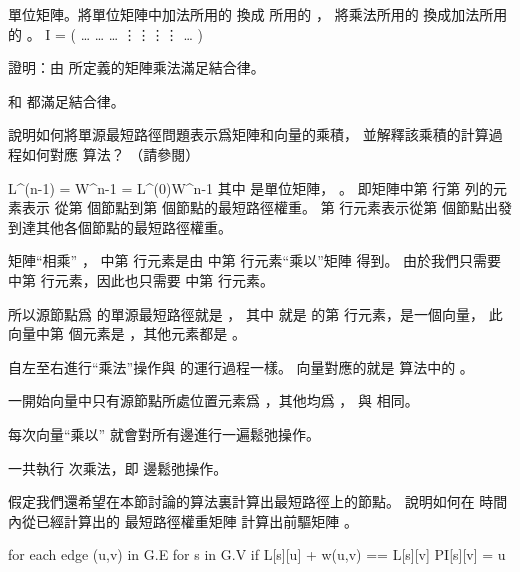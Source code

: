 \startANSWER
單位矩陣。將單位矩陣中加法所用的  換成 \m{\min} 所用的 \m{\infty}，
將乘法所用的  換成加法所用的 。
\startformula
I = \left(\startmatrix
{}   \NC \ldots {} \NR
{}   \NC \ldots {} \NR
{}   \NC \ldots {} \NR
\NC \vdots \NC \vdots \NC \vdots \NC \ddots \NC \vdots \NR
{}   \NC \ldots {} \NR
\stopmatrix\right)
\stopformula
\stopANSWER

\startEXERCISE
證明：由  所定義的矩陣乘法滿足結合律。
\stopEXERCISE

\startANSWER
\m{\min} 和 \m{+} 都滿足結合律。
\stopANSWER

\startEXERCISE
說明如何將單源最短路徑問題表示爲矩陣和向量的乘積，
並解釋該乘積的計算過程如何對應  算法？
（請參閱）
\stopEXERCISE

\startANSWER
\startformula
L^{(n-1)} = W^{n-1} = L^{(0)}\cdot W^{n-1}
\stopformula
其中  是單位矩陣， 。
即矩陣中第  行第  列的元素表示
從第  個節點到第  個節點的最短路徑權重。
第  行元素表示從第  個節點出發到達其他各個節點的最短路徑權重。

矩陣“相乘” ，
  中第  行元素是由  中第  行元素“乘以”矩陣  得到。
由於我們只需要  中第  行元素，因此也只需要  中第  行元素。

所以源節點爲  的單源最短路徑就是 ，
其中  就是  的第  行元素，是一個向量，
此向量中第  個元素是 ，其他元素都是 \m{\infty}。

自左至右進行“乘法”操作與  的運行過程一樣。
向量對應的就是  算法中的 。

\startigBase[2]
\item 一開始向量中只有源節點所處位置元素爲 ，其他均爲 \m{\infty}，
與  相同。
\item 每次向量“乘以”  就會對所有邊進行一遍鬆弛操作。
\item 一共執行  次乘法，即  邊鬆弛操作。
\stopigBase
\stopANSWER

\startEXERCISE
假定我們還希望在本節討論的算法裏計算出最短路徑上的節點。
說明如何在  時間內從已經計算出的
最短路徑權重矩陣  計算出前驅矩陣 \m{\prod}。
\stopEXERCISE

\startANSWER
\startCLRS
for each edge (u,v) in G.E
	for s in G.V
		if L[s][u] + w(u,v) == L[s][v]
			PI[s][v] = u
\stopCLRS
\stopANSWER

